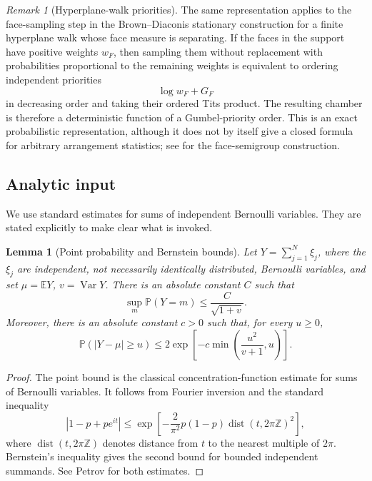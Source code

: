 \documentclass[11pt]{article}
\newtheorem{lemma}[theorem]{Lemma}
\theoremstyle{remark}
\newtheorem{remark}[theorem]{Remark}
\newcommand{\Pp}{\mathbb P}
\newcommand{\Ee}{\mathbb E}
\newcommand{\Var}{\operatorname{Var}}
\begin{document}
\begin{remark}[Hyperplane-walk priorities]\label{rem:hyperplane-gumbel}
The same representation applies to the face-sampling step in the Brown--Diaconis
stationary construction for a finite hyperplane walk whose face measure is
separating.  If the faces in the support have positive weights \(w_F\), then
sampling them without replacement with probabilities proportional to the
remaining weights is equivalent to ordering independent priorities
\[
        \log w_F+G_F
\]
in decreasing order and taking their ordered Tits product.  The resulting
chamber is therefore a deterministic function of a Gumbel-priority order.  This
is an exact probabilistic representation, although it does not by itself give a
closed formula for arbitrary arrangement statistics; see
\cite{BHR1999,BD1998} for the face-semigroup construction.
\end{remark}

\subsection{Analytic input}
We use standard estimates for sums of independent Bernoulli variables.  They are stated explicitly to make clear what is invoked.

\begin{lemma}[Point probability and Bernstein bounds]\label{lem:bernstein-point}
Let \(Y=\sum_{j=1}^N \xi_j\), where the \(\xi_j\) are independent, not necessarily identically distributed, Bernoulli variables, and set \(\mu=\Ee Y\), \(v=\Var Y\).  There is an absolute constant \(C\) such that
\[
        \sup_m \Pp(Y=m)\le \frac{C}{\sqrt{1+v}}.
\]
Moreover, there is an absolute constant \(c>0\) such that, for every \(u\ge0\),
\[
        \Pp(|Y-\mu|\ge u)\le
        2\exp\left[-c\min\left(\frac{u^2}{v+1},u\right)\right].
\]
\end{lemma}

\begin{proof}
The point bound is the classical concentration-function estimate for sums of Bernoulli variables.  It follows from Fourier inversion and the standard inequality
\[
        |1-p+pe^{it}|
        \le \exp\left[-\frac{2}{\pi^2}p(1-p)\operatorname{dist}(t,2\pi\mathbb Z)^2\right],
\]
where \(\operatorname{dist}(t,2\pi\mathbb Z)\) denotes distance from \(t\) to the nearest multiple of \(2\pi\).  Bernstein's inequality gives the second bound for bounded independent summands.  See Petrov \cite[Chapter VII]{Petrov1975} for both estimates.
\end{proof}
\end{document}
